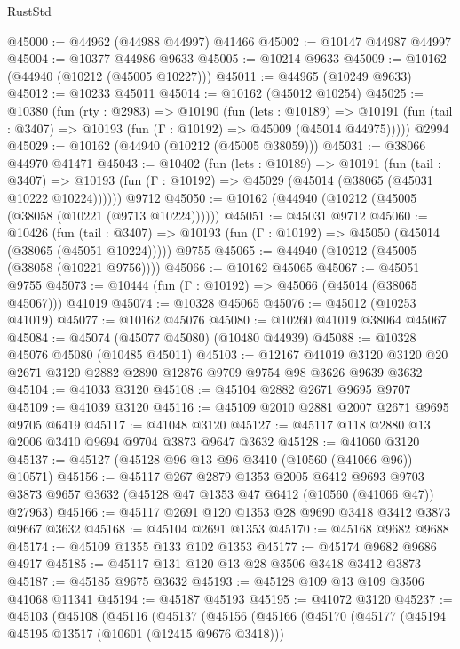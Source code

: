 \begin{lexlean}{RustStd}
\begin{coremodule}
@45000 := @44962 (@44988 @44997) @41466
@45002 := @10147 @44987 @44997
@45004 := @10377 @44986 @9633
@45005 := @10214 @9633
@45009 := @10162 (@44940 (@10212 (@45005 @10227)))
@45011 := @44965 (@10249 @9633)
@45012 := @10233 @45011
@45014 := @10162 (@45012 @10254)
@45025 := @10380
    (fun (rty : @2983) =>
    @10190
      (fun (lets : @10189) =>
      @10191 (fun (tail : @3407) => @10193 (fun (Γ : @10192) => @45009 (@45014 @44975)))))
    @2994
@45029 := @10162 (@44940 (@10212 (@45005 @38059)))
@45031 := @38066 @44970 @41471
@45043 := @10402
    (fun (lets : @10189) =>
    @10191
      (fun (tail : @3407) =>
      @10193 (fun (Γ : @10192) => @45029 (@45014 (@38065 (@45031 @10222 @10224))))))
    @9712
@45050 := @10162 (@44940 (@10212 (@45005 (@38058 (@10221 (@9713 @10224))))))
@45051 := @45031 @9712
@45060 := @10426
    (fun (tail : @3407) => @10193 (fun (Γ : @10192) => @45050 (@45014 (@38065 (@45051 @10224)))))
    @9755
@45065 := @44940 (@10212 (@45005 (@38058 (@10221 @9756))))
@45066 := @10162 @45065
@45067 := @45051 @9755
@45073 := @10444 (fun (Γ : @10192) => @45066 (@45014 (@38065 @45067))) @41019
@45074 := @10328 @45065
@45076 := @45012 (@10253 @41019)
@45077 := @10162 @45076
@45080 := @10260 @41019 @38064 @45067
@45084 := @45074 (@45077 @45080) (@10480 @44939)
@45088 := @10328 @45076 @45080 (@10485 @45011)
@45103 := @12167
    @41019
    @3120
    @3120
    @20
    @2671
    @3120
    @2882
    @2890
    @12876
    @9709
    @9754
    @98
    @3626
    @9639
    @3632
@45104 := @41033 @3120
@45108 := @45104 @2882 @2671 @9695 @9707
@45109 := @41039 @3120
@45116 := @45109 @2010 @2881 @2007 @2671 @9695 @9705 @6419
@45117 := @41048 @3120
@45127 := @45117 @118 @2880 @13 @2006 @3410 @9694 @9704 @3873 @9647 @3632
@45128 := @41060 @3120
@45137 := @45127 (@45128 @96 @13 @96 @3410 (@10560 (@41066 @96)) @10571)
@45156 := @45117
    @267
    @2879
    @1353
    @2005
    @6412
    @9693
    @9703
    @3873
    @9657
    @3632
    (@45128 @47 @1353 @47 @6412 (@10560 (@41066 @47)) @27963)
@45166 := @45117 @2691 @120 @1353 @28 @9690 @3418 @3412 @3873 @9667 @3632
@45168 := @45104 @2691 @1353
@45170 := @45168 @9682 @9688
@45174 := @45109 @1355 @133 @102 @1353
@45177 := @45174 @9682 @9686 @4917
@45185 := @45117 @131 @120 @13 @28 @3506 @3418 @3412 @3873
@45187 := @45185 @9675 @3632
@45193 := @45128 @109 @13 @109 @3506 @41068 @11341
@45194 := @45187 @45193
@45195 := @41072 @3120
@45237 := @45103
    (@45108
      (@45116
        (@45137
          (@45156
            (@45166
              (@45170
                (@45177
                  (@45194 @45195 @13517 (@10601 (@12415 @9676 @3418)))

\end{coremodule}
\end{lexlean}
